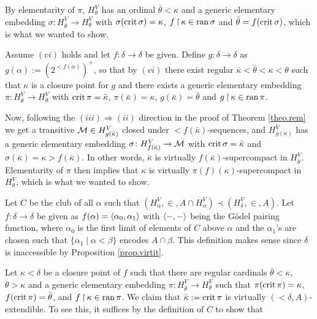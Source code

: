 \documentclass[../../main]{subfiles}
\begin{document}
{  \qquad By elementarity of $\pi$, $H_\theta^V$ has an ordinal $\bar\theta<\kappa$ and a generic elementary embedding $\sigma\colon H_{\bar\theta}^V\to H_\theta^V$ with $\sigma(\operatorname{crit}\sigma)=\kappa$, $f\operatorname{\upharpoonright}\kappa\in\operatorname{ran}\sigma$ and $\bar\theta = f(\operatorname{crit}\sigma)$, which is what we wanted to show.

  \qquad {} Assume $(vi)$ holds and let $f\colon\delta\to\delta$ be given. Define $g\colon\delta\to\delta$ as $g(\alpha):=(2^{<f(\alpha)})^+$, so that by $(vi)$ there exist regular $\bar\kappa<\bar\theta<\kappa<\theta$ such that $\kappa$ is a closure point for $g$ and there exists a generic elementary embedding $\pi\colon H_{\bar\theta}^V\to H_\theta^V$ with $\operatorname{crit}\pi = \bar\kappa$, $\pi(\bar\kappa)=\kappa$, $g(\bar\kappa)=\bar\theta$ and $g\operatorname{\upharpoonright}\kappa\in\operatorname{ran}\pi$.

  \qquad Now, following the $(iii)\Rightarrow(ii)$ direction in the proof of Theorem \ref{theo.rem} we get a transitive $\operatorname{\mathcal M}\in H_{g(\bar\kappa)}^V$ closed under ${<}f(\bar\kappa)$-sequences, and $H_{g(\bar\kappa)}^V$ has a generic elementary embedding $\sigma\colon H_{f(\bar\kappa)}^V\to\operatorname{\mathcal M}$ with $\operatorname{crit}\sigma=\bar\kappa$ and $\sigma(\bar\kappa)=\kappa> f(\bar\kappa)$. In other words, $\bar\kappa$ is virtually $f(\bar\kappa)$-supercompact in $H_{\bar\theta}^V$. Elementarity of $\pi$ then implies that $\kappa$ is virtually $\pi(f)(\kappa)$-supercompact in $H_\theta^V$, which is what we wanted to show.

  \qquad {} Let $C$ be the club of all $\alpha$ such that $(H_\alpha^V,\in, A\cap H_\alpha^V)\prec(H_\delta^V,\in,A)$. Let $f\colon\delta\to\delta$ be given as $f(\alpha)=\langle \alpha_0,\alpha_1\rangle$ with $\langle -,-\rangle$ being the G\"odel pairing function, where $\alpha_0$ is the first limit of elements of $C$ above $\alpha$ and the $\alpha_1$'s are chosen such that $\{\alpha_1\mid\alpha<\beta\}$ encodes $A\cap\beta$. This definition makes sense since $\delta$ is inaccessible by Proposition \ref{prop.virtit}.

  \qquad Let $\kappa<\delta$ be a closure point of $f$ such that there are regular cardinals $\bar\theta<\kappa$, $\theta>\kappa$ and a generic elementary embedding $\pi\colon H_{\bar\theta}^V\to H_\theta^V$ such that $\pi(\operatorname{crit}\pi)=\kappa$, $f(\operatorname{crit}\pi)=\bar\theta$, and $f\operatorname{\upharpoonright}\kappa\in\operatorname{ran}\pi$. We claim that $\bar\kappa:=\operatorname{crit}\pi$ is virtually $({<}\delta, A)$-extendible. To see this, it suffices by the definition of $C$ to show that

}
\end{document}
